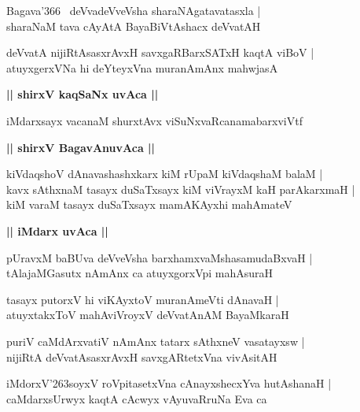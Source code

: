 \documentclass[twoside,12pt,openright]{book}
\def\S{\char'263}
\newcounter{shloka}[chapter]
\def\uvaca#1{\centerline{{\large\textbf{#1}}}}
\begin{document}
\begin{shloka}%
Bagava\char'366 ~deVvadeVveVsha sharaNAgatavatasxla |\\
sharaNaM tava cAyAtA BayaBiVtAshacx deVvatAH
\end{shloka}

\begin{shloka}%
deVvatA nijiRtAsasxrAvxH savxgaRBarxSATxH kaqtA viBoV |\\
atuyxgerxVNa hi deYteyxVna muranAmAnx mahwjasA
\end{shloka}

\uvaca{|| shirxV kaqSaNx uvAca ||}

\begin{shloka}%
iMdarxsayx vacanaM shurxtAvx viSuNxvaRcanamabarxviVtf
\end{shloka}

\uvaca{|| shirxV BagavAnuvAca ||}

\begin{shloka}%
kiVdaqshoV dAnavashashxkarx kiM rUpaM kiVdaqshaM balaM |\\
kavx sAthxnaM  tasayx duSaTxsayx kiM viVrayxM kaH parAkarxmaH |\\
kiM varaM tasayx duSaTxsayx mamAKAyxhi mahAmateV 
\end{shloka}

\uvaca{|| iMdarx uvAca ||}

\begin{shloka}%
pUravxM baBUva deVveVsha barxhamxvaMshasamudaBxvaH |\\
tAlajaMGasutx nAmAnx ca atuyxgorxVpi mahAsuraH 
\end{shloka}

\begin{shloka}%
tasayx putorxV hi viKAyxtoV muranAmeVti dAnavaH |\\
atuyxtakxToV mahAviVroyxV deVvatAnAM BayaMkaraH
\end{shloka}

\begin{shloka}%
puriV caMdArxvatiV nAmAnx tatarx sAthxneV vasatayxsw |\\
nijiRtA deVvatAsasxrAvxH savxgARtetxVna vivAsitAH
\end{shloka}

\begin{shloka}%
iMdorxV\S soyxV roVpitasetxVna cAnayxshecxYva hutAshanaH |\\
caMdarxsUrwyx kaqtA cAcwyx vAyuvaRruNa Eva ca
\end{shloka}
\end{document}
